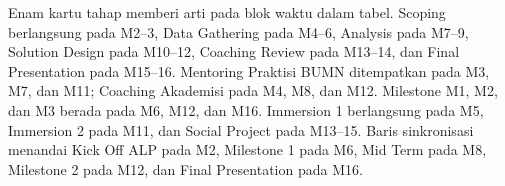 \begin{visualexplanation}
Enam kartu tahap memberi arti pada blok waktu dalam tabel. Scoping berlangsung pada M2--3, Data Gathering pada M4--6, Analysis pada M7--9, Solution Design pada M10--12, Coaching Review pada M13--14, dan Final Presentation pada M15--16. Mentoring Praktisi BUMN ditempatkan pada M3, M7, dan M11; Coaching Akademisi pada M4, M8, dan M12. Milestone M1, M2, dan M3 berada pada M6, M12, dan M16. Immersion 1 berlangsung pada M5, Immersion 2 pada M11, dan Social Project pada M13--15. Baris sinkronisasi menandai Kick Off ALP pada M2, Milestone 1 pada M6, Mid Term pada M8, Milestone 2 pada M12, dan Final Presentation pada M16.
\end{visualexplanation}